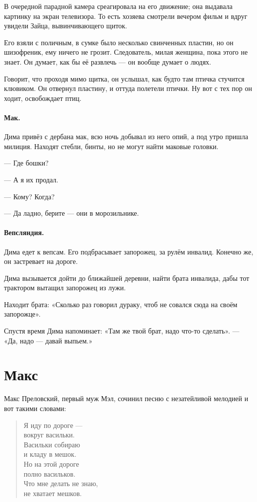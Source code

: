 \documentclass{book}
\begin{document}
В очередной парадной камера среагировала на его движение; она выдавала картинку на экран телевизора.
То есть хозяева смотрели вечером фильм и вдруг увидели Зайца, вывинчивающего щиток.

Его взяли с поличным, в сумке было несколько свинченных пластин,
но он шизофреник, ему ничего не грозит.
Следователь, милая женщина, пока этого не знает.
Он думает, как бы её развлечь --- он вообще думает о людях.

Говорит, что проходя мимо щитка, он услышал, как будто там птичка стучится клювиком.
Он отвернул пластину, и оттуда полетели птички.
Ну вот с тех пор он ходит, освобождает птиц.

\paragraph{Мак.}
Дима привёз с дербана мак, всю ночь добывал из него опий, а под утро пришла милиция.
Находят стебли, бинты, но не могут найти маковые головки.

--- Где бошки?

--- А я их продал.

--- Кому? Когда? 

--- Да ладно, берите --- они в морозильнике.

\paragraph{Вепсляндия.}
Дима едет к вепсам.
Его подбрасывает запорожец, за рулём инвалид.
Конечно же, он застревает на дороге.

Дима вызывается дойти до ближайшей деревни, найти брата инвалида, дабы тот трактором вытащил запорожец из лужи.

Находит брата:
«Сколько раз говорил дураку, чтоб не совался сюда на своём запорожце».

Спустя время Дима напоминает: «Там же твой брат, надо что-то сделать». --- «Да, надо --- давай выпьем.»

\section*{Макс}

Макс Преловский, первый муж Мэл, сочинил песню с незатейливой мелодией и вот такими словами:
\begin{verse}
Я иду по дороге ---
\\
\qquad вокруг васильки.
\\
Васильки собираю
\\
\qquad и кладу в мешок.
\\
Но на этой дороге
\\
\qquad полно васильков.
\\
Что мне делать не знаю,
\\
\qquad не хватает мешков.
\end{verse}
\end{document}
